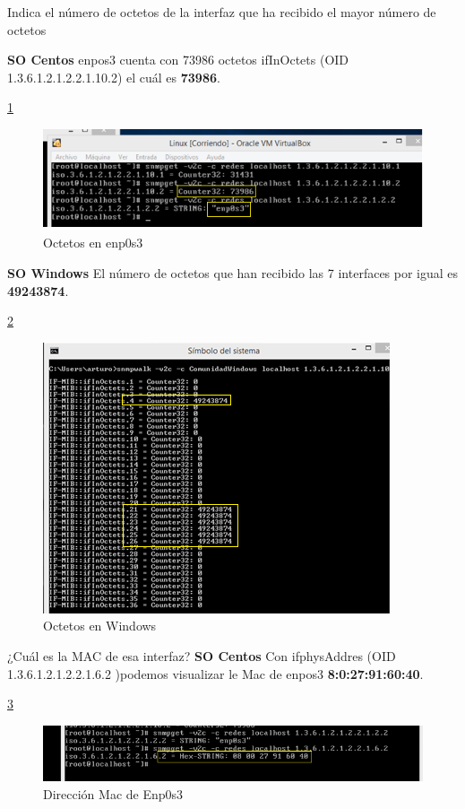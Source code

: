 \item Indica el número de octetos  de la interfaz que ha recibido el mayor número de octetos

\textbf{SO Centos}
enpos3 cuenta con 73986 octetos ifInOctets (OID 1.3.6.1.2.1.2.2.1.10.2) el cuál es \textbf{73986}.

\ref{image:Pregunta5C}
 \FloatBarrier
\begin{figure}[htbp!]
		\centering
		    \includegraphics[width=.5 \textwidth]{../images/Pregunta5C.png} 
		\caption{Octetos en enp0s3}
		\label{image:Pregunta5C}
\end{figure}
\FloatBarrier

\textbf{SO Windows}
El número de octetos que han recibido las 7 interfaces por igual es \textbf{49243874}.

 \ref{image:Pregunta5W}
 \FloatBarrier
\begin{figure}[htbp!]
		\centering
		    \includegraphics[width=.5 \textwidth]{../images/Pregunta5W.png} 
		\caption{Octetos en Windows}
		\label{image:Pregunta5W}
\end{figure}
\FloatBarrier

\item ¿Cuál es la MAC de esa interfaz?
\textbf{SO Centos}
Con ifphysAddres (OID 1.3.6.1.2.1.2.2.1.6.2 )podemos visualizar le Mac de enpos3 \textbf{8:0:27:91:60:40}.

 \ref{image:Pregunta6C}
 \FloatBarrier
\begin{figure}[htbp!]
		\centering
		    \includegraphics[width=.5 \textwidth]{../images/Pregunta6C.png} 
		\caption{Dirección Mac de Enp0s3}
		\label{image:Pregunta6C}
\end{figure}
\FloatBarrier

